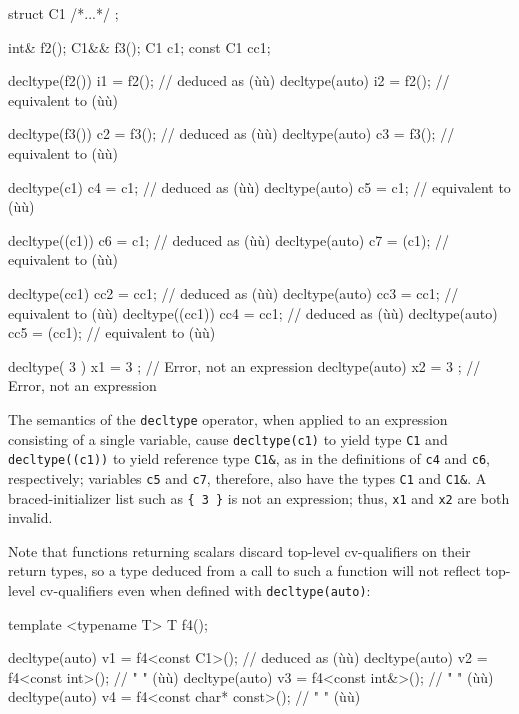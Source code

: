 \begin{emcppslisting}[emcppsbatch=e2,emcppsstandards={c++14}]
struct C1 { /*...*/ };

int&     f2();
C1&&     f3();
C1       c1;
const C1 cc1;

decltype(f2())  i1  = f2();   // deduced as (ù{}ù)
decltype(auto)  i2  = f2();   // equivalent to (ù{}ù)

decltype(f3())  c2  = f3();   // deduced as (ù{}ù)
decltype(auto)  c3  = f3();   // equivalent to (ù{}ù)

decltype(c1)    c4  = c1;     // deduced as (ù{}ù)
decltype(auto)  c5  = c1;     // equivalent to (ù{}ù)

decltype((c1))  c6  = c1;     // deduced as (ù{}ù)
decltype(auto)  c7  = (c1);   // equivalent to (ù{}ù)

decltype(cc1)   cc2 = cc1;    // deduced as (ù{}ù)
decltype(auto)  cc3 = cc1;    // equivalent to (ù{}ù)
decltype((cc1)) cc4 = cc1;    // deduced as (ù{}ù)
decltype(auto)  cc5 = (cc1);  // equivalent to (ù{}ù)

decltype({ 3 }) x1 = { 3 };   // Error, not an expression
decltype(auto)  x2 = { 3 };   // Error, not an expression
\end{emcppslisting}
    

The semantics of the \lstinline!decltype! operator, when applied to an
expression consisting of a single variable, cause \lstinline!decltype(c1)!
to yield type \lstinline!C1! and \lstinline!decltype((c1))! to yield reference
type \lstinline!C1&!, as in the definitions of \lstinline!c4! and
\lstinline!c6!, respectively; variables \lstinline!c5! and \lstinline!c7!,
therefore, also have the types \lstinline!C1! and \lstinline!C1&!. A
braced-initializer list such as \lstinline!{!~\lstinline!3!~\lstinline!}! is not
an expression; thus, \lstinline!x1! and \lstinline!x2! are both invalid.

Note that functions returning scalars discard top-level cv-qualifiers on
their return types, so a type deduced from a call to such a function
will not reflect top-level cv-qualifiers even when defined with
\lstinline!decltype(auto)!:

\begin{emcppslisting}[emcppsbatch=e2]
template <typename T> T f4();

decltype(auto) v1 = f4<const C1>();           // deduced as (ù{}ù)
decltype(auto) v2 = f4<const int>();          //    "     " (ù{}ù)
decltype(auto) v3 = f4<const int&>();         //    "     " (ù{}ù)
decltype(auto) v4 = f4<const char* const>();  //    "     " (ù{}ù)
\end{emcppslisting}
    

